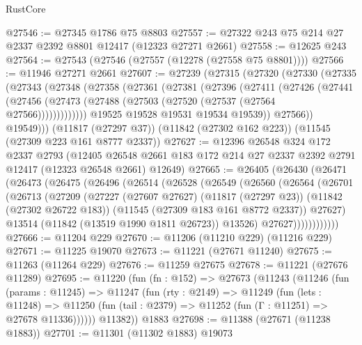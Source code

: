 \begin{lexlean}{RustCore}
\begin{coremodule}
@27546 := @27345 @1786 @75 @8803
@27557 := @27322 @243 @75 @214 @27 @2337 @2392 @8801 @12417 (@12323 @27271 @2661)
@27558 := @12625 @243
@27564 := @27543 (@27546 (@27557 (@12278 (@27558 @75 @8801))))
@27566 := @11946 @27271 @2661
@27607 := @27239
    (@27315
      (@27320
        (@27330
          (@27335
            (@27343
              (@27348
                (@27358
                  (@27361
                    (@27381
                      (@27396
                        (@27411
                          (@27426
                            (@27441
                              (@27456
                                (@27473 (@27488 (@27503 (@27520 (@27537 (@27564 @27566)))))))))))))
                  @19525
                  @19528
                  @19531
                  @19534
                  @19539))
              @27566))
          @19549)))
    (@11817 (@27297 @37))
    (@11842 (@27302 @162 @223))
    (@11545 (@27309 @223 @161 @8777 @2337))
@27627 := @12396
    @26548
    @324
    @172
    @2337
    @2793
    (@12405 @26548 @2661 @183 @172 @214 @27 @2337 @2392 @2791 @12417 (@12323 @26548 @2661) @12649)
@27665 := @26405
    (@26430
      (@26471
        (@26473
          (@26475
            (@26496
              (@26514
                (@26528
                  (@26549
                    (@26560
                      (@26564
                        (@26701
                          (@26713
                            (@27209
                              (@27227
                                (@27607 @27627)
                                (@11817 (@27297 @23))
                                (@11842 (@27302 @26722 @183))
                                (@11545 (@27309 @183 @161 @8772 @2337))
                                @27627)
                              @13514
                              (@11842 (@13519 @1990 @1811 @26723))
                              @13526)
                            @27627))))))))))))
@27666 := @11204 @229
@27670 := @11206 (@11210 @229) (@11216 @229)
@27671 := @11225 @19070
@27673 := @11221 (@27671 @11240)
@27675 := @11263 (@11264 @229)
@27676 := @11259 @27675
@27678 := @11221 (@27676 @11289)
@27695 := @11220
    (fun (fn : @152) =>
    @27673
      (@11243
        (@11246
          (fun (params : @11245) =>
          @11247
            (fun (rty : @2149) =>
            @11249
              (fun (lets : @11248) =>
              @11250 (fun (tail : @2379) => @11252 (fun (Γ : @11251) => @27678 @11336))))))
        @11382))
    @1883
@27698 := @11388 (@27671 (@11238 @1883))
@27701 := @11301 (@11302 @1883) @19073

\end{coremodule}
\end{lexlean}
